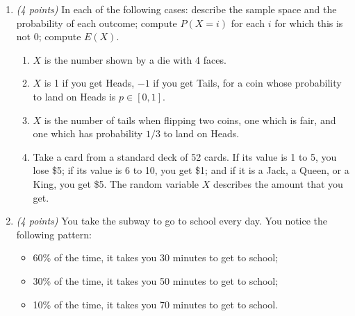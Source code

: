 \documentclass[12pt]{article}
\begin{document}
\begin{enumerate}

\item \emph{(4 points)} In each of the following cases: describe the sample space and the probability of each outcome; compute \( P(X = i) \) for each \( i \) for which this is not 0; compute \( E(X) \). 

\begin{enumerate}
\item \( X \) is the number shown by a die with 4 faces. \newline


\item \( X \) is 1 if you get Heads, \( -1 \) if you get Tails, for a coin whose probability to land on Heads is \( p \in [0,1] \). \newline


\item \( X \) is the number of tails when flipping two coins, one which is fair, and one which has probability \( 1/3 \) to land on Heads. \newline


\item Take a card from a standard deck of 52 cards. If its value is 1 to 5, you lose \$5; if its value is 6 to 10, you get \$1; and if it is a Jack, a Queen, or a King, you get \$5. The random variable \( X \) describes the amount that you get. \newline


\end{enumerate}

\item \emph{(4 points)} You take the subway to go to school every day. You notice the following pattern:
\begin{itemize}
\item 60\% of the time, it takes you 30 minutes to get to school; 
\item 30\% of the time, it takes you 50 minutes to get to school; 
\item 10\% of the time, it takes you 70 minutes to get to school. 
\end{itemize}


\end{enumerate}
\end{document}
